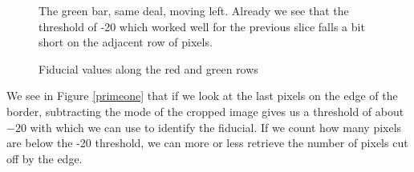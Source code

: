 \documentclass[10pt]{scrartcl}
\begin{document}
\begin{figure}[!ht]
{\begin{subfloatrow}[2]
{       }%
       {%
       \caption{The green bar, same deal, moving left. Already we see that the threshold of -20 which worked well for the previous slice falls a bit short on the adjacent row of pixels.}%
       }%
    \end{subfloatrow}}{\caption{Fiducial values along the red and green rows}\label{firstone}}%
\end{figure}


We see in Figure \ref{primeone} that if we look at the last pixels on the edge of the border, subtracting the mode of the cropped image gives us a threshold of about $-20$ with which we can use to identify the fiducial. If we count how many pixels are below the -20 threshold, we can more or less retrieve the number of pixels cut off by the edge. 

\end{document}
